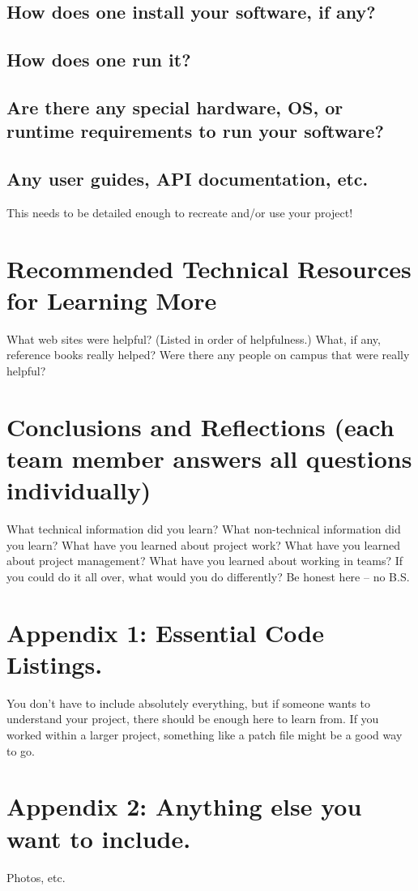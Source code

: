 \documentclass[journal,10pt,onecolumn,compsoc]{IEEEtran}
\begin{document}
    \subsection{How does one install your software, if any?}
    \subsection{How does one run it?}
    \subsection{Are there any special hardware, OS, or runtime requirements to run your software?}
    \subsection{Any user guides, API documentation, etc.}
    This needs to be detailed enough to recreate and/or use your project!
    \section{Recommended Technical Resources for Learning More}
    What web sites were helpful? (Listed in order of helpfulness.)
    What, if any, reference books really helped?
    Were there any people on campus that were really helpful?
    \section{Conclusions and Reflections (each team member answers all questions individually)}
    What technical information did you learn?
    What non-technical information did you learn?
    What have you learned about project work?
    What have you learned about project management?
    What have you learned about working in teams?
    If you could do it all over, what would you do differently?
    Be honest here -- no B.S.
    
    \section{Appendix 1: Essential Code Listings.}
    You don't have to include absolutely everything, but if someone wants to understand your project, there should be enough here to learn from. If you worked within a larger project, something like a patch file might be a good way to go.
    
    
    \section{Appendix 2: Anything else you want to include.}
    Photos, etc.
    
    
    
    
\end{document}
